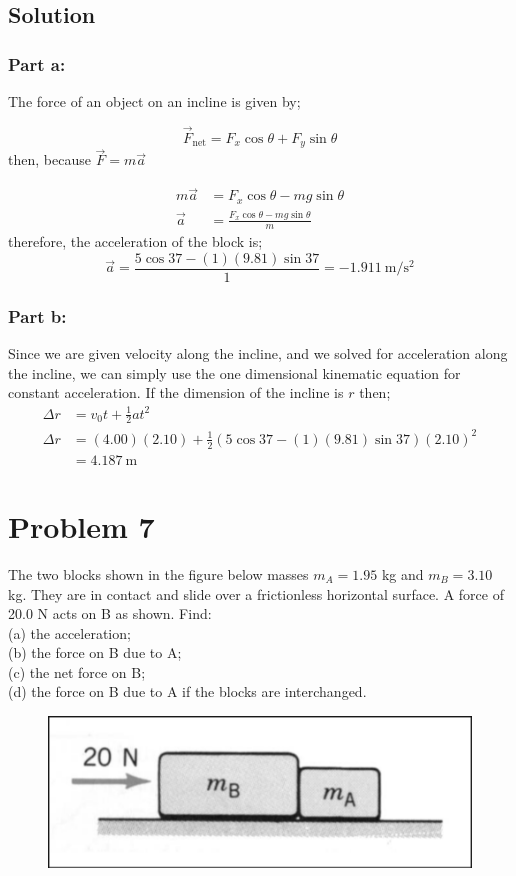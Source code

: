 \documentclass{article}
\begin{document}
\subsection*{Solution}
\subsubsection*{Part a:}
The force of an object on an incline is given by;

\begin{equation}
	\vec{F}_\text{net} = F_x \cos \theta + F_y \sin \theta
\end{equation}
then, because $\vec{F} = m \vec{a}$

\begin{align*}
	m \vec{a} &= F_x \cos \theta - mg \sin \theta \\
	\vec{a} &= \frac{F_x \cos \theta - mg \sin \theta}{m}
\end{align*}
therefore, the acceleration of the block is;
\[
	\vec{a} = \frac{5 \cos 37 - (1)(9.81) \sin 37}{1} = \boxed{-1.911\ \text{m}/\text{s}^2}
\]

\subsubsection*{Part b:}
Since we are given velocity along the incline, and we solved for acceleration along the incline, we can simply use the one dimensional kinematic equation for constant acceleration. If the dimension of the incline is $r$ then;
\begin{align*}
	\Delta r &= v_0t+\frac{1}{2}at^2 \\
	\Delta r &= (4.00)(2.10)+\frac{1}{2}\left(5 \cos 37 - (1)(9.81) \sin 37\right)(2.10)^2 \\
		 &= \boxed{4.187\ \text{m}}
\end{align*}

\section*{Problem 7}
The two blocks shown in the figure below masses $m_A = 1.95$ kg and $m_B = 3.10$ kg. They are in contact
and slide over a frictionless horizontal surface. A force of 20.0 N acts on B as shown. Find: \\
(a) the acceleration; \\
(b) the force on B due to A; \\
(c) the net force on B; \\
(d) the force on B due to A if the blocks are interchanged.
\begin{figure}[ht]
    \centering
    \includegraphics[scale=.4]{drawing-5.png}
\end{figure}
\end{document}

